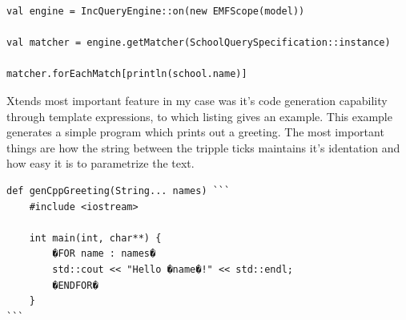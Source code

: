 \begin{lstlisting}[frame=single, language=Xtend,
label=listing:XtendIntro, caption=Usage of the \EIQ{} API with Xtend] 
val engine = IncQueryEngine::on(new EMFScope(model))

val matcher = engine.getMatcher(SchoolQuerySpecification::instance)

matcher.forEachMatch[println(school.name)]
\end{lstlisting}

Xtends most important feature in my case was it's code generation capability
through template expressions, to which listing  gives an
example. This example generates a simple \CPP{} program which prints out a
greeting. The most important things are how the string between the tripple ticks
maintains it's identation and how easy it is to parametrize the text.

\begin{lstlisting}[frame=single, language=Xtend,
label=listing:XtendCodeGen, caption=Xtend code generation] 
def genCppGreeting(String... names) ```
	#include <iostream>

	int main(int, char**) {
		�FOR name : names�
		std::cout << "Hello �name�!" << std::endl;
		�ENDFOR�
	}
```
\end{lstlisting}